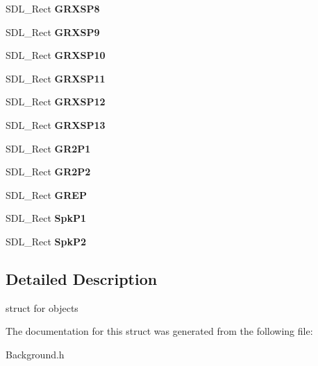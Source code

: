 \begin{DoxyCompactItemize}
\mbox{\label{structworld__objects_aa461092cdc7a3fa0019c3af2b4c20ca4}} 
S\+D\+L\+\_\+\+Rect {\bfseries G\+R\+X\+S\+P8}
\item 
\mbox{\label{structworld__objects_a53313688951a55eeab7bc0d8e1e35123}} 
S\+D\+L\+\_\+\+Rect {\bfseries G\+R\+X\+S\+P9}
\item 
\mbox{\label{structworld__objects_a5a20620332d908e87510cc68670c81ce}} 
S\+D\+L\+\_\+\+Rect {\bfseries G\+R\+X\+S\+P10}
\item 
\mbox{\label{structworld__objects_a828f7a9e6c187423b4e59f9fb81c3e49}} 
S\+D\+L\+\_\+\+Rect {\bfseries G\+R\+X\+S\+P11}
\item 
\mbox{\label{structworld__objects_afdf64246983c251a1a2f320f162148a1}} 
S\+D\+L\+\_\+\+Rect {\bfseries G\+R\+X\+S\+P12}
\item 
\mbox{\label{structworld__objects_a1b9705ede91987a468f7bcccf331128d}} 
S\+D\+L\+\_\+\+Rect {\bfseries G\+R\+X\+S\+P13}
\item 
\mbox{\label{structworld__objects_ab7e557a6d5dea179b2ffd85619d0d453}} 
S\+D\+L\+\_\+\+Rect {\bfseries G\+R2\+P1}
\item 
\mbox{\label{structworld__objects_a9d4b035c997f172365ef47ae87c160ea}} 
S\+D\+L\+\_\+\+Rect {\bfseries G\+R2\+P2}
\item 
\mbox{\label{structworld__objects_a17c03e60781852dd68c1718f5d7462e4}} 
S\+D\+L\+\_\+\+Rect {\bfseries G\+R\+EP}
\item 
\mbox{\label{structworld__objects_a2a0637231fa4b616719252826b51dad6}} 
S\+D\+L\+\_\+\+Rect {\bfseries Spk\+P1}
\item 
\mbox{\label{structworld__objects_adbb70d55b4243c3e475ca89eafbedb20}} 
S\+D\+L\+\_\+\+Rect {\bfseries Spk\+P2}
\end{DoxyCompactItemize}


\subsection{Detailed Description}
struct for objects 

The documentation for this struct was generated from the following file\+:\begin{DoxyCompactItemize}
\item 
Background.\+h\end{DoxyCompactItemize}
